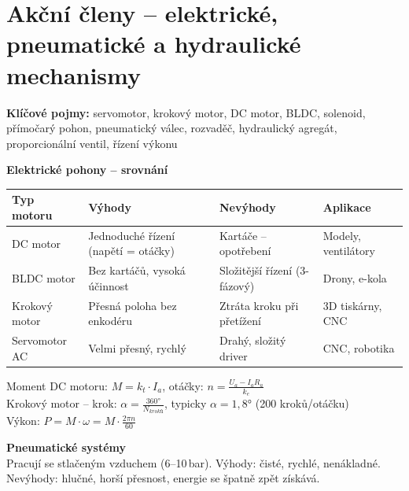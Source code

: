 \documentclass[a4paper,10pt]{article}
\begin{document}
\section{Akční členy -- elektrické, pneumatické a hydraulické mechanismy}

\begin{pojmybox}
\textbf{Klíčové pojmy:}
servomotor, krokový motor, DC motor, BLDC, solenoid,
přímočarý pohon, pneumatický válec, rozvaděč, hydraulický agregát,
proporcionální ventil, řízení výkonu
\end{pojmybox}

\begin{vysvetlenibox}
\textbf{Elektrické pohony -- srovnání}

\begin{center}
\begin{tabularx}{0.95\linewidth}{@{} l X X X @{}}
    \toprule
    \textbf{Typ motoru} & \textbf{Výhody} & \textbf{Nevýhody}
                        & \textbf{Aplikace} \\
    \midrule
    DC motor       & Jednoduché řízení (napětí = otáčky)
                   & Kartáče -- opotřebení & Modely, ventilátory \\
    BLDC motor     & Bez kartáčů, vysoká účinnost
                   & Složitější řízení (3-fázový) & Drony, e-kola \\
    Krokový motor  & Přesná poloha bez enkodéru
                   & Ztráta kroku při přetížení & 3D tiskárny, CNC \\
    Servomotor AC  & Velmi přesný, rychlý
                   & Drahý, složitý driver & CNC, robotika \\
    \bottomrule
\end{tabularx}
\end{center}

\begin{vzorcebox}
Moment DC motoru: $M = k_t \cdot I_a$,
otáčky: $n = \frac{U_a - I_a R_a}{k_e}$\\
Krokový motor -- krok: $\alpha = \frac{360°}{N_{kroků}}$,
typicky $\alpha = 1{,}8°$ (200 kroků/otáčku)\\
Výkon: $P = M \cdot \omega = M \cdot \frac{2\pi n}{60}$
\end{vzorcebox}

\textbf{Pneumatické systémy}\\
Pracují se stlačeným vzduchem (6--10\,bar).
Výhody: čisté, rychlé, nenákladné.
Nevýhody: hlučné, horší přesnost, energie se špatně zpět získává.


\end{vysvetlenibox}
\end{document}
